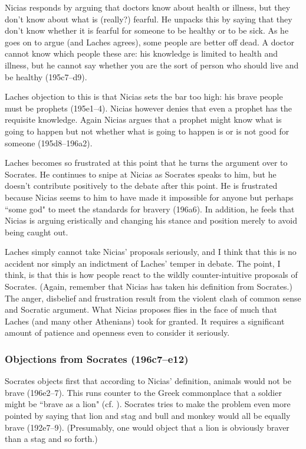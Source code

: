 \documentclass[11pt]{article}
\begin{document}
Nicias responds by arguing that doctors know about health or illness, but
they don't know about what is (really?) fearful.  He unpacks this by saying
that they don't know whether it is fearful for someone to be healthy or to
be sick.  As he goes on to argue (and Laches agrees), some people are
better off dead.  A doctor cannot know which people these are: his
knowledge is limited to health and illness, but he cannot say whether you
are the sort of person who should live and be healthy (195c7--d9).

Laches objection to this is that Nicias sets the bar too high: his brave
people must be prophets (195e1--4).  Nicias however denies that even
a prophet has the requisite knowledge.  Again Nicias argues that a prophet
might know what is going to happen but not whether what is going to happen
is or is not good for someone (195d8--196a2).

Laches becomes so frustrated at this point that he turns the argument over
to Socrates.  He continues to snipe at Nicias as Socrates speaks to him,
but he doesn't contribute positively to the debate after this point.  He is
frustrated because Nicias seems to him to have made it impossible for
anyone but perhaps ``some god" to meet the standards for bravery (196a6).
In addition, he feels that Nicias is arguing eristically and changing his
stance and position merely to avoid being caught out.

Laches simply cannot take Nicias' proposals seriously, and I think that
this is no accident nor simply an indictment of Laches' temper in debate.
The point, I think, is that this is how people react to the wildly
counter-intuitive proposals of Socrates.  (Again, remember that Nicias has
taken his definition from Socrates.)  The anger, disbelief and frustration
result from the violent clash of common sense and Socratic argument.  What
Nicias proposes flies in the face of much that Laches (and many other
Athenians) took for granted.  It requires a significant amount of patience
and openness even to consider it seriously.


\subsubsection{Objections from Socrates (196c7--e12)}

Socrates objects first that according to Nicias' definition, animals would
not be brave (196e2--7).  This runs counter to the Greek commonplace that
a soldier might be ``brave as a lion" (cf.  ).
Socrates tries to make the problem even more pointed by saying that lion
and stag and bull and monkey would all be equally brave (192e7--9).
(Presumably, one would object that a lion is obviously braver than a stag
and so forth.)
\end{document}
